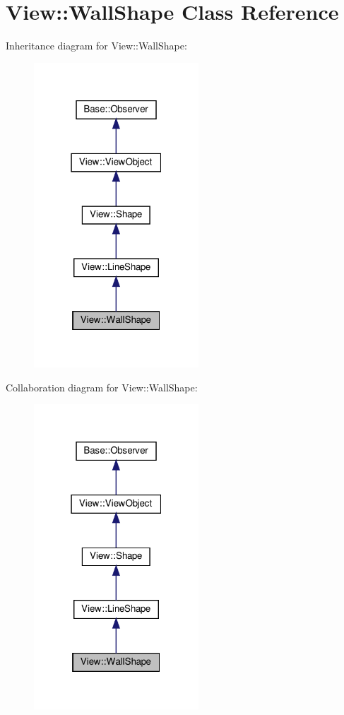 \hypertarget{class_view_1_1_wall_shape}{}\section{View\+:\+:Wall\+Shape Class Reference}
\label{class_view_1_1_wall_shape}


Inheritance diagram for View\+:\+:Wall\+Shape\+:
\nopagebreak
\begin{figure}[H]
\begin{center}
\leavevmode
\includegraphics[width=175pt]{class_view_1_1_wall_shape__inherit__graph}
\end{center}
\end{figure}


Collaboration diagram for View\+:\+:Wall\+Shape\+:
\nopagebreak
\begin{figure}[H]
\begin{center}
\leavevmode
\includegraphics[width=175pt]{class_view_1_1_wall_shape__coll__graph}
\end{center}
\end{figure}
